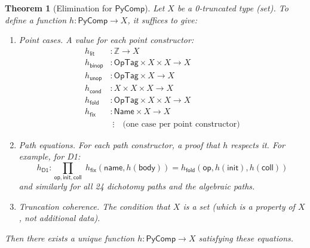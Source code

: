 \documentclass[11pt,a4paper]{report}
\theoremstyle{definition}
\theoremstyle{plain}
\newtheorem{theorem}[definition]{Theorem}
\newcommand{\Int}{\mathbb{Z}}
\newcommand{\fold}{\mathsf{fold}}
\begin{document}
\begin{theorem}[Elimination for $\mathsf{PyComp}$]
\label{thm:pycomp-elim}
Let $X$ be a 0-truncated type (set).  To define a function
$h : \mathsf{PyComp} \to X$,
it suffices to give:
\begin{enumerate}[label=(\alph*)]
  \item \emph{Point cases.}  A value for each point constructor:
    \begin{align*}
      h_{\mathsf{lit}} &: \Int \to X \\
      h_{\mathsf{binop}} &: \mathsf{OpTag} \times X \times X \to X \\
      h_{\mathsf{unop}} &: \mathsf{OpTag} \times X \to X \\
      h_{\mathsf{cond}} &: X \times X \times X \to X \\
      h_{\fold} &: \mathsf{OpTag} \times X \times X \to X \\
      h_{\mathsf{fix}} &: \mathsf{Name} \times X \to X \\
      &\;\vdots \quad \text{(one case per point constructor)}
    \end{align*}
  \item \emph{Path equations.}  For each path constructor, a proof that
    $h$ respects it.  For example, for D1:
    \[
      h_{\mathsf{D1}} : \prod_{\mathsf{op}, \mathsf{init}, \mathsf{coll}}\;
      h_{\mathsf{fix}}(\mathsf{name}, h(\mathsf{body}))
      = h_{\fold}(\mathsf{op}, h(\mathsf{init}), h(\mathsf{coll}))
    \]
    and similarly for all 24 dichotomy paths and the algebraic paths.
  \item \emph{Truncation coherence.}  The condition that $X$ is a set
    (which is a property of $X$, not additional data).
\end{enumerate}
Then there exists a \emph{unique} function $h : \mathsf{PyComp} \to X$
satisfying these equations.
\end{theorem}
\end{document}
